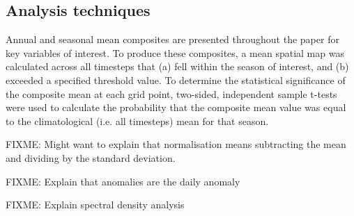 \subsection{Analysis techniques}

Annual and seasonal mean composites are presented throughout the paper for key variables of interest. To produce these composites, a mean spatial map was calculated across all timesteps that (a) fell within the season of interest, and (b) exceeded a specified threshold value. To determine the statistical significance of the composite mean at each grid point, two-sided, independent sample t-tests were used to calculate the probability that the composite mean value was equal to the climatological (i.e. all timesteps) mean for that season.    

FIXME: Might want to explain that normalisation means subtracting the mean and dividing by the standard deviation.

FIXME: Explain that anomalies are the daily anomaly

FIXME: Explain spectral density analysis